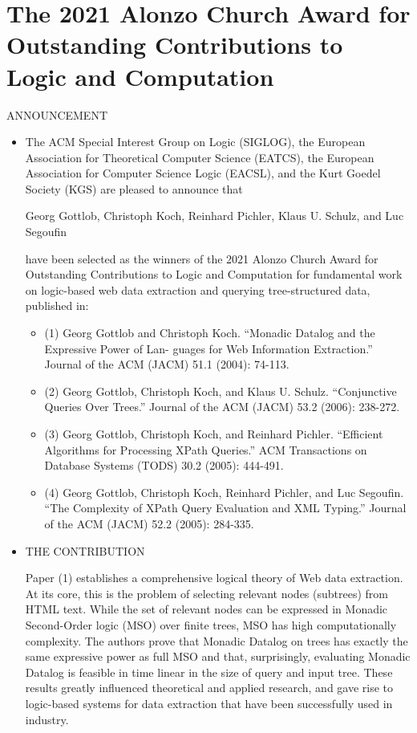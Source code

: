 \documentclass[prodmode,acmtecs]{acmsmall} %
\begin{document}
\section{The 2021 Alonzo Church Award for Outstanding Contributions to Logic and Computation}\label{The2021AlonzoChurchAwardforOutstandingContributionstoLogicandComputation}ANNOUNCEMENT 

\begin{itemize}\item  The ACM Special Interest Group on Logic (SIGLOG), the European Association for Theoretical Computer Science (EATCS), the European Association for Computer Science Logic (EACSL), and the Kurt Goedel Society (KGS) are pleased to announce that 
 
  Georg Gottlob, Christoph Koch, Reinhard Pichler, Klaus U. Schulz, and Luc Segouﬁn 
 
  have been selected as the winners of the 2021 Alonzo Church Award for Outstanding Contributions to Logic and Computation for fundamental work on logic-based web data extraction and querying tree-structured data, published in: 
 
\begin{itemize}\item  (1) Georg Gottlob and Christoph Koch. “Monadic Datalog and the Expressive Power of Lan- guages for Web Information Extraction.” Journal of the ACM (JACM) 51.1 (2004): 74-113.
\item  (2) Georg Gottlob, Christoph Koch, and Klaus U. Schulz. “Conjunctive Queries Over Trees.” Journal of the ACM (JACM) 53.2 (2006): 238-272.
\item  (3) Georg Gottlob, Christoph Koch, and Reinhard Pichler. “Eﬃcient Algorithms for Processing XPath Queries.” ACM Transactions on Database Systems (TODS) 30.2 (2005): 444-491.
\item  (4) Georg Gottlob, Christoph Koch, Reinhard Pichler, and Luc Segouﬁn. “The Complexity of XPath Query Evaluation and XML Typing.” Journal of the ACM (JACM) 52.2 (2005): 284-335.
\end{itemize} 
\item  THE CONTRIBUTION 
 
  Paper (1) establishes a comprehensive logical theory of Web data extraction. At its core, this is the problem of selecting relevant nodes (subtrees) from HTML text. While the set of relevant nodes can be expressed in Monadic Second-Order logic (MSO) over ﬁnite trees, MSO has high computationally complexity. The authors prove that Monadic Datalog on trees has exactly the same expressive power as full MSO and that, surprisingly, evaluating Monadic Datalog is feasible in time linear in the size of query and input tree. These results greatly inﬂuenced theoretical and applied research, and gave rise to logic-based systems for data extraction that have been successfully used in industry. 
 

\end{itemize}
\end{document}
